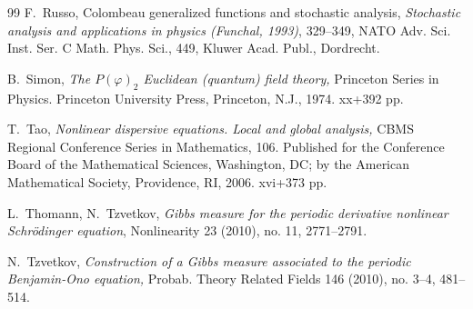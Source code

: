 \documentclass[letterpaper, 11pt,  reqno]{amsart}
\newcommand{\1}{\hspace{0.5mm}\text{I}\hspace{0.5mm}}
\numberwithin{equation}{section}
\numberwithin{theorem}{section}
\begin{document}
\begin{thebibliography}{99}
F.~Russo, 
 Colombeau generalized functions and stochastic analysis,  {\it Stochastic analysis and applications in physics (Funchal, 1993)}, 329--349, NATO Adv. Sci. Inst. Ser. C Math. Phys. Sci., 449, Kluwer Acad. Publ., Dordrecht. %



B.~Simon, 
{\it  The $P(\varphi)_2$ Euclidean (quantum) field theory,} Princeton Series in Physics. Princeton University Press, Princeton, N.J., 1974. xx+392 pp.



T.~Tao, {\it Nonlinear dispersive equations. Local and global analysis,} CBMS Regional Conference Series in Mathematics, 106. Published for the Conference Board of the Mathematical Sciences, Washington, DC; by the American Mathematical Society, Providence, RI, 2006. xvi+373 pp.

L.~Thomann, N.~Tzvetkov, 
{\it Gibbs measure for the periodic derivative nonlinear Schr\"odinger equation},
Nonlinearity 23 (2010), no. 11, 2771--2791.


N.~Tzvetkov, {\it Construction of a Gibbs measure associated to the periodic Benjamin-Ono equation,} Probab. Theory Related Fields 146 (2010), no. 3--4, 481--514.


%



\end{thebibliography}
\end{document}

